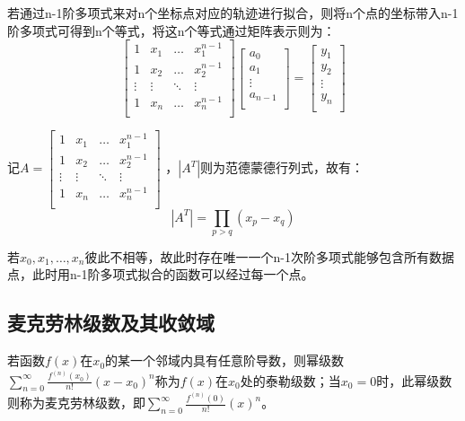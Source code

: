 若通过n-1阶多项式来对n个坐标点对应的轨迹进行拟合，则将n个点的坐标带入n-1阶多项式可得到n个等式，将这n个等式通过矩阵表示则为：
\begin{equation}
\label{vandermonde}
\left[ \begin{matrix}
	1&		x_1&		\dots&		x_{1}^{n-1}\\
	1&		x_2&		\dots&		x_{2}^{n-1}\\
	\vdots&		\vdots&		\ddots&		\vdots\\
	1&		x_n&		\dots&		x_{n}^{n-1}\\
\end{matrix} \right] \left[ \begin{array}{c}
	a_0\\
	a_1\\
	\vdots\\
	a_{n-1}\\
\end{array} \right] =\left[ \begin{array}{c}
	y_1\\
	y_2\\
	\vdots\\
	y_n\\
\end{array} \right] 
\end{equation}

记$A=\left[ \begin{matrix}
	1&		x_1&		\dots&		x_{1}^{n-1}\\
	1&		x_2&		\dots&		x_{2}^{n-1}\\
	\vdots&		\vdots&		\ddots&		\vdots\\
	1&		x_n&		\dots&		x_{n}^{n-1}\\
\end{matrix} \right] $
，$\left|A^{T}\right|$则为范德蒙德行列式，故有：
\begin{equation}
\left|A^{T}\right|=\prod_{p>q}\left(x_{p}-x_{q}\right)
\end{equation}

若$x_0,x_1,…,x_n$彼此不相等，故此时存在唯一一个n-1次阶多项式能够包含所有数据点，此时用n-1阶多项式拟合的函数可以经过每一个点。

\subsection{麦克劳林级数及其收敛域}
若函数$f(x)$在$x_0$的某一个邻域内具有任意阶导数，则幂级数$\sum_{n=0}^{\infty}{\frac{f^{\left( n \right)}\left( x_0 \right)}{n!}}\left( x-x_0 \right) ^n$称为$f(x)$在$x_0$处的泰勒级数；当$x_0=0$时，此幂级数则称为麦克劳林级数，即$\sum_{n=0}^{\infty}{\frac{f^{\left( n \right)}\left( 0 \right)}{n!}}\left( x \right) ^n$。


